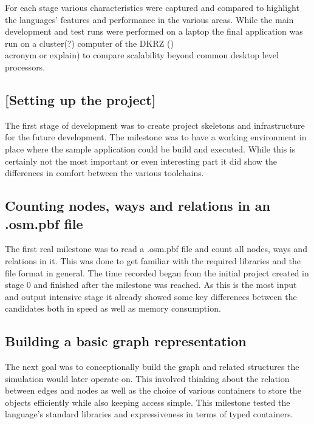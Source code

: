 For each stage various characteristics were captured and compared to highlight the languages' features and performance in the various areas. While the main development and test runs were performed on a laptop the final application was run on a cluster(?) computer of the DKRZ ()\\acronym or explain) to compare scalability beyond common desktop level processors.

\setcounter{subsection}{-1}

\subsection{[Setting up the project]}
\label{subsec:Approach::Implementation::Setup}

The first stage of development was to create project skeletons and infrastructure for the future development. The milestone was to have a working environment in place where the sample application could be build and executed. While this is certainly not the most important or even interesting part it did show the differences in comfort between the various toolchains.

\subsection{Counting nodes, ways and relations in an .osm.pbf file}
\label{subsec:Approach::Implementation::Counting}

The first real milestone was to read a .osm.pbf file and count all nodes, ways and relations in it. This was done to get familiar with the required libraries and the file format in general. The time recorded began from the initial project created in stage 0 and finished after the milestone was reached. As this is the most input and output intensive stage it already showed some key differences between the candidates both in speed as well as memory consumption.

\subsection{Building a basic graph representation}
\label{subsec:Approach::Implementation::Graph_Representation}

The next goal was to conceptionally build the graph and related structures the simulation would later operate on. This involved thinking about the relation between edges and nodes as well as the choice of various containers to store the objects efficiently while also keeping access simple. This milestone tested the language's standard libraries and expressiveness in terms of typed containers.

